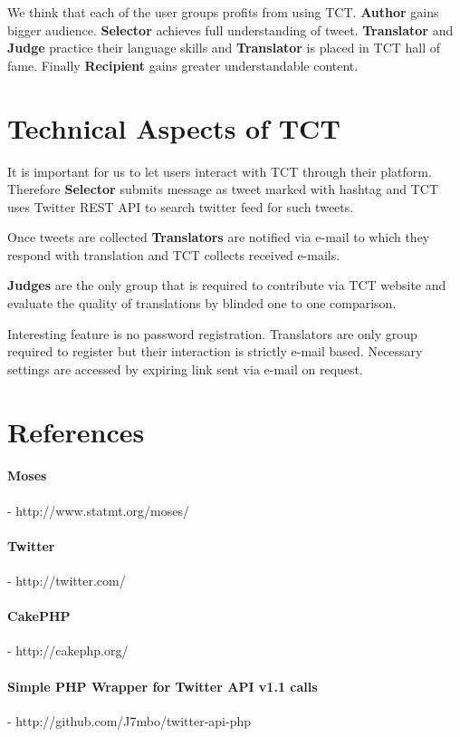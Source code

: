 \documentclass[11pt]{article}
\begin{document}
We think that each of the user groups profits from using TCT. 
\textbf{Author} gains bigger audience. 
\textbf{Selector} achieves full understanding of tweet.
\textbf{Translator} and \textbf{Judge} practice their language skills 
and \textbf{Translator} is placed in TCT hall of fame.
Finally \textbf{Recipient} gains greater understandable content.

\section{Technical Aspects of TCT}
\label{implementation}
It is important for us to let users interact with TCT through their platform.
Therefore \textbf{Selector} submits message as tweet marked with hashtag 
 and TCT uses Twitter REST API to search twitter feed
for such tweets.

Once tweets are collected \textbf{Translators} are notified via e-mail
to which they respond with translation and TCT collects received e-mails.

\textbf{Judges} are the only group that is required to contribute via 
TCT website and evaluate the quality of translations by blinded one to one 
comparison. 

Interesting feature is no password registration. 
Translators are only group required to register but their interaction
is strictly e-mail based. 
Necessary settings are accessed by expiring link sent via e-mail on request. 

\section*{References}


 

\paragraph{Moses} - http://www.statmt.org/moses/
\paragraph{Twitter} - http://twitter.com/
\paragraph{CakePHP} - http://cakephp.org/
\paragraph{Simple PHP Wrapper for Twitter API v1.1 calls} - http://github.com/J7mbo/twitter-api-php
\end{document}
